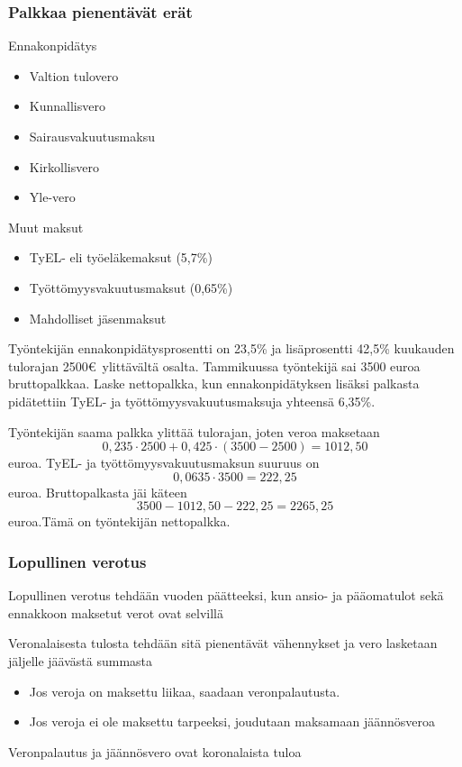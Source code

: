 \documentclass[]{beamer}\usepackage[]{graphicx}\usepackage[]{color}
\begin{document}
\begin{frame}
\frametitle{Palkkaa pienentävät erät}
	\begin{block}{Ennakonpidätys}
		\begin{itemize}
			\item Valtion tulovero
			\item Kunnallisvero
			\item Sairausvakuutusmaksu
			\item Kirkollisvero
			\item Yle-vero
		\end{itemize}
	\end{block}
	\begin{block}{Muut maksut}
		\begin{itemize}
			\item TyEL- eli työeläkemaksut (5,7\%)
			\item Työttömyysvakuutusmaksut (0,65\%)
			\item Mahdolliset jäsenmaksut
		\end{itemize}
	\end{block}
\end{frame}

\begin{frame}
	\begin{esim}
		Työntekijän ennakonpidätysprosentti on 23,5\% ja lisäprosentti 42,5\% kuukauden tulorajan 2500\euro\ ylittävältä osalta. Tammikuussa työntekijä sai 3500 euroa bruttopalkkaa. Laske nettopalkka, kun ennakonpidätyksen lisäksi palkasta pidätettiin TyEL- ja työttömyysvakuutusmaksuja yhteensä 6,35\%.
	\end{esim}
\end{frame}

\begin{frame}
	\begin{ratkaisu}
		Työntekijän saama palkka ylittää tulorajan\pause , joten veroa maksetaan 
		\[
			0,235\cdot2500 + 0,425\cdot(3500-2500) = 1012,50
		\] euroa. \pause TyEL- ja työttömyysvakuutusmaksun suuruus on\pause 
		\[
			0,0635\cdot 3500 = 222,25
		\] euroa. \pause
		Bruttopalkasta jäi käteen\pause
		\[
			3500-1012,50-222,25 = 2265,25
		\]
		 euroa.\pause Tämä on työntekijän nettopalkka.
	\end{ratkaisu}
\end{frame}


\begin{frame}
\frametitle{Lopullinen verotus}
\pause
Lopullinen verotus tehdään vuoden päätteeksi, kun ansio- ja pääomatulot sekä ennakkoon maksetut verot ovat selvillä
\begin{block}{}
Veronalaisesta tulosta tehdään sitä pienentävät vähennykset ja vero lasketaan jäljelle jäävästä summasta 
	\begin{itemize}
		\item Jos veroja on maksettu liikaa, saadaan veronpalautusta.
		\item Jos veroja ei ole maksettu tarpeeksi, joudutaan maksamaan jäännösveroa
	\end{itemize}
\end{block}
\pause
Veronpalautus ja jäännösvero ovat koronalaista tuloa
\end{frame}
\end{document}
